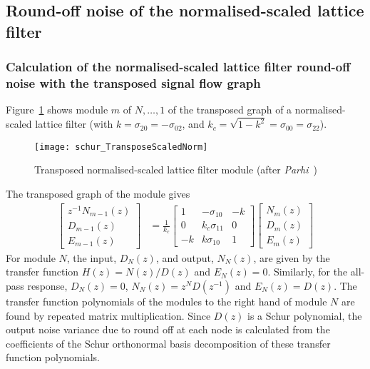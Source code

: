 \documentclass[a4paper,twoside,10pt,english]{report}
\begin{document}
\subsection{\label{sec:Round-off-normalised-scaled-lattice}Round-off noise of the normalised-scaled lattice filter}
\subsubsection{Calculation of the normalised-scaled lattice filter round-off noise with the transposed signal flow graph}
\noindent Figure~\ref{fig:Transposed-normalised-scaled} shows module
$m$ of $N,\ldots,1$ of the transposed graph of a normalised-scaled
lattice filter (with $k=\sigma_{20}=-\sigma_{02}$, and 
$k_{c}=\sqrt{1-k^{2}}=\sigma_{00}=\sigma_{22}$).
\begin{figure}[!htbp]
\begin{center}
\texttt{[image: schur\_TransposeScaledNorm]}
\caption{Transposed normalised-scaled lattice filter module (after 
\emph{Parhi}~\cite[Fig. 12.24]{Parhi_VLSIDigitalSignalProcessingSystems})}
\label{fig:Transposed-normalised-scaled}
\end{center}
\end{figure}
The transposed graph of the module gives
\begin{align*}
\left[\begin{array}{c}
z^{-1}N_{m-1}\left(z\right)\\
D_{m-1}\left(z\right)\\
E_{m-1}\left(z\right)
\end{array}\right] & = \frac{1}{k_{c}}\left[\begin{array}{ccc}
1 & -\sigma_{10} & -k\\
0 & k_{c}\sigma_{11} & 0\\
-k & k\sigma_{10} & 1
\end{array}\right]\left[\begin{array}{c}
N_{m}\left(z\right)\\
D_{m}\left(z\right)\\
E_{m}\left(z\right)
\end{array}\right]
\end{align*}
For module $N$, the input, $D_{N}\left(z\right)$, and output, $N_{N}\left(z\right)$,
are given by the transfer function $H\left(z\right)=N\left(z\right)/D\left(z\right)$
and $E_{N}\left(z\right)=0$. Similarly, for the all-pass response, $D_{N}\left(z\right)=0$,
$N_{N}\left(z\right)=z^{N}D\left(z^{-1}\right)$ and $E_{N}\left(z\right)=D\left(z\right)$.
The transfer function polynomials of the modules to the right hand
of module $N$ are found by repeated matrix multiplication. Since
$D\left(z\right)$ is a Schur polynomial, the output noise variance due to round
off at each node is calculated from the coefficients of the Schur
orthonormal basis decomposition of these transfer function polynomials.
\end{document}
